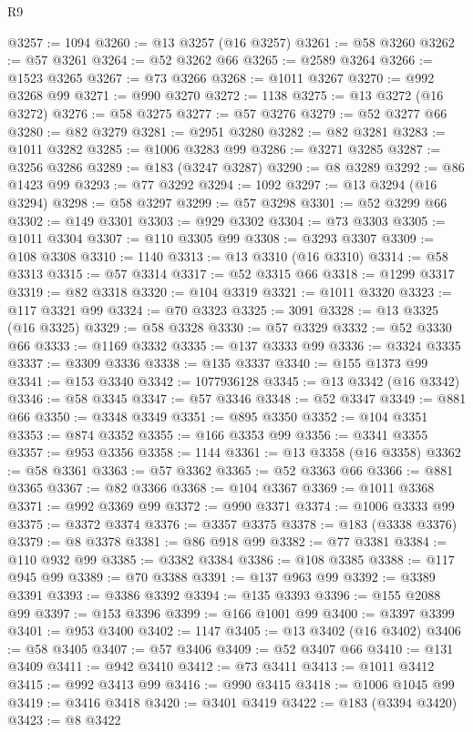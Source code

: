 \begin{lexlean}{R9}
\begin{coremodule}
@3257 := 1094
@3260 := @13 @3257 (@16 @3257)
@3261 := @58 @3260
@3262 := @57 @3261
@3264 := @52 @3262 @66
@3265 := @2589 @3264
@3266 := @1523 @3265
@3267 := @73 @3266
@3268 := @1011 @3267
@3270 := @992 @3268 @99
@3271 := @990 @3270
@3272 := 1138
@3275 := @13 @3272 (@16 @3272)
@3276 := @58 @3275
@3277 := @57 @3276
@3279 := @52 @3277 @66
@3280 := @82 @3279
@3281 := @2951 @3280
@3282 := @82 @3281
@3283 := @1011 @3282
@3285 := @1006 @3283 @99
@3286 := @3271 @3285
@3287 := @3256 @3286
@3289 := @183 (@3247 @3287)
@3290 := @8 @3289
@3292 := @86 @1423 @99
@3293 := @77 @3292
@3294 := 1092
@3297 := @13 @3294 (@16 @3294)
@3298 := @58 @3297
@3299 := @57 @3298
@3301 := @52 @3299 @66
@3302 := @149 @3301
@3303 := @929 @3302
@3304 := @73 @3303
@3305 := @1011 @3304
@3307 := @110 @3305 @99
@3308 := @3293 @3307
@3309 := @108 @3308
@3310 := 1140
@3313 := @13 @3310 (@16 @3310)
@3314 := @58 @3313
@3315 := @57 @3314
@3317 := @52 @3315 @66
@3318 := @1299 @3317
@3319 := @82 @3318
@3320 := @104 @3319
@3321 := @1011 @3320
@3323 := @117 @3321 @99
@3324 := @70 @3323
@3325 := 3091
@3328 := @13 @3325 (@16 @3325)
@3329 := @58 @3328
@3330 := @57 @3329
@3332 := @52 @3330 @66
@3333 := @1169 @3332
@3335 := @137 @3333 @99
@3336 := @3324 @3335
@3337 := @3309 @3336
@3338 := @135 @3337
@3340 := @155 @1373 @99
@3341 := @153 @3340
@3342 := 1077936128
@3345 := @13 @3342 (@16 @3342)
@3346 := @58 @3345
@3347 := @57 @3346
@3348 := @52 @3347
@3349 := @881 @66
@3350 := @3348 @3349
@3351 := @895 @3350
@3352 := @104 @3351
@3353 := @874 @3352
@3355 := @166 @3353 @99
@3356 := @3341 @3355
@3357 := @953 @3356
@3358 := 1144
@3361 := @13 @3358 (@16 @3358)
@3362 := @58 @3361
@3363 := @57 @3362
@3365 := @52 @3363 @66
@3366 := @881 @3365
@3367 := @82 @3366
@3368 := @104 @3367
@3369 := @1011 @3368
@3371 := @992 @3369 @99
@3372 := @990 @3371
@3374 := @1006 @3333 @99
@3375 := @3372 @3374
@3376 := @3357 @3375
@3378 := @183 (@3338 @3376)
@3379 := @8 @3378
@3381 := @86 @918 @99
@3382 := @77 @3381
@3384 := @110 @932 @99
@3385 := @3382 @3384
@3386 := @108 @3385
@3388 := @117 @945 @99
@3389 := @70 @3388
@3391 := @137 @963 @99
@3392 := @3389 @3391
@3393 := @3386 @3392
@3394 := @135 @3393
@3396 := @155 @2088 @99
@3397 := @153 @3396
@3399 := @166 @1001 @99
@3400 := @3397 @3399
@3401 := @953 @3400
@3402 := 1147
@3405 := @13 @3402 (@16 @3402)
@3406 := @58 @3405
@3407 := @57 @3406
@3409 := @52 @3407 @66
@3410 := @131 @3409
@3411 := @942 @3410
@3412 := @73 @3411
@3413 := @1011 @3412
@3415 := @992 @3413 @99
@3416 := @990 @3415
@3418 := @1006 @1045 @99
@3419 := @3416 @3418
@3420 := @3401 @3419
@3422 := @183 (@3394 @3420)
@3423 := @8 @3422

\end{coremodule}
\end{lexlean}
